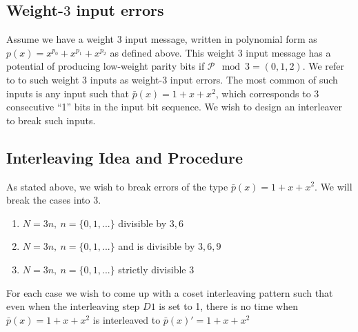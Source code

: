 \documentclass[11pt, oneside, dvipdfmx]{book}
\begin{document}
 \subsection{Weight-$3$ input errors}
 Assume we have a weight 3 input message, written in polynomial form as $p(x)=x^{p_0}+x^{p_1}+x^{p_2}$ as defined above. This weight 3 input message has a potential of producing low-weight parity bits if $\mathcal{P} \mod 3 =(0,1,2)$. We refer to to such weight 3 inputs as weight-$3$ input errors. The most common of such inputs is any input such that $\bar{p}(x)=1+x+x^2$, which corresponds to 3 consecutive ``1'' bits in the input bit sequence. We wish to design an interleaver to break such inputs. 
 
 \subsection{Interleaving Idea and Procedure}
 As stated above, we wish to break errors of the type $\bar{p}(x)=1+x+x^2$. We will break the cases into 3. 
 \begin{enumerate}
 
  \item $N=3n,~n=\{0,1,...\}$ divisible by $3,6$
  
 \item $N=3n,~n=\{0,1,...\}$ and is divisible by $3,6,9$
 
 \item $N=3n,~n=\{0,1,...\}$ strictly divisible $3$
 \end{enumerate}
 
 For each case we wish to come up with a coset interleaving pattern such that even when the interleaving step $D1$ is set to 1, there is no time when $\bar{p}(x)=1+x+x^2$ is interleaved to $\bar{p}(x)'=1+x+x^2$
 
 
 
\end{document}
